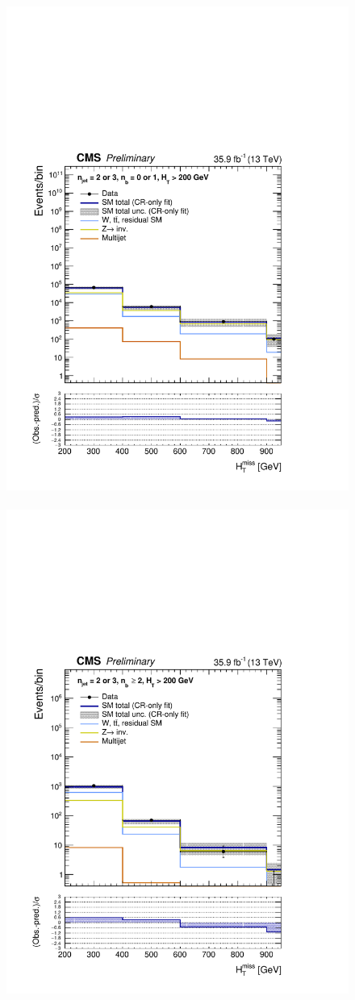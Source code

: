 \begin{figure}[h!]
  \includegraphics[width=0.8\linewidth]{figures/results/36invfb/aggregated/postFitShapeCR/mhtShape_eq01b_eq23j_200_Inf_crfit.pdf} ~
  \includegraphics[width=0.8\linewidth]{figures/results/36invfb/aggregated/postFitShapeCR/mhtShape_ge2b_eq23j_200_Inf_crfit.pdf} ~

\end{figure}

